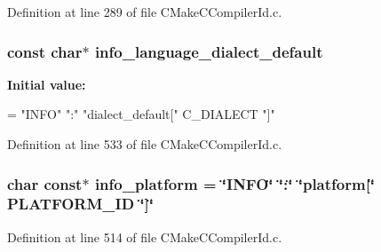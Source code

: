 Definition at line 289 of file C\+Make\+C\+Compiler\+Id.\+c.

\subsubsection[{info\+\_\+language\+\_\+dialect\+\_\+default}]{\setlength{\rightskip}{0pt plus 5cm}const char$\ast$ info\+\_\+language\+\_\+dialect\+\_\+default}\label{_c_make_c_compiler_id_8c_a1ce162bad2fe6966ac8b33cc19e120b8}
{\bfseries Initial value\+:}
\begin{DoxyCode}
=
  \textcolor{stringliteral}{"INFO"} \textcolor{stringliteral}{":"} \textcolor{stringliteral}{"dialect\_default["} C_DIALECT \textcolor{stringliteral}{"]"}
\end{DoxyCode}


Definition at line 533 of file C\+Make\+C\+Compiler\+Id.\+c.

\subsubsection[{info\+\_\+platform}]{\setlength{\rightskip}{0pt plus 5cm}char const$\ast$ info\+\_\+platform = \char`\"{}I\+N\+FO\char`\"{} \char`\"{}\+:\char`\"{} \char`\"{}platform[\char`\"{} P\+L\+A\+T\+F\+O\+R\+M\+\_\+\+ID \char`\"{}]\char`\"{}}\label{_c_make_c_compiler_id_8c_a2321403dee54ee23f0c2fa849c60f7d4}


Definition at line 514 of file C\+Make\+C\+Compiler\+Id.\+c.

